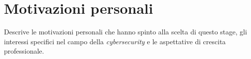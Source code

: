 \section{Motivazioni personali}
Descrive le motivazioni personali che hanno spinto alla scelta di questo stage, gli interessi specifici nel campo della \textit{cybersecurity} e le aspettative di crescita professionale.